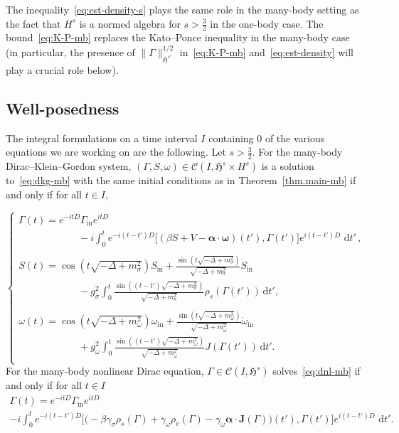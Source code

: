 \documentclass[10pt]{amsart}
\theoremstyle{definition}\newtheorem{defi}[theo]{Definition}\newtheorem{rema}[theo]{Remark}\newtheorem{exam}[theo]{Example}\newtheorem{exem}[theo]{Example}\newtheorem{nota}[theo]{Notation}
\newcommand{\rmin}{\mathrm{in}}
\newcommand{\cC}{\mathcal{C}}
\newcommand{\gH}{\mathfrak{H}}
\renewcommand\d[1]{{\ensuremath{\,\text{d}#1}}}
\newcommand{\dps}{\displaystyle}
\begin{document}
The inequality~\eqref{eq:est-density-s} plays the same role in the many-body setting as the fact that $H^s$ is a normed algebra for $s>\tfrac32$ in the one-body case. The bound~\eqref{eq:K-P-mb} replaces the Kato--Ponce inequality in the many-body case (in particular, the presence of $\|\Gamma\|_{\gH^{s'}}^{1/2}$ in~\eqref{eq:K-P-mb} and~\eqref{eq:est-density} will play a crucial role below).

\subsection{Well-posedness}

The integral formulations on a time interval $I$ containing $0$ of the various equations we are working on are the following. Let $s>\tfrac32$. For the many-body Dirac--Klein--Gordon system, $(\Gamma,S,\omega)\in\cC(I,\gH^s\times H^s)$ is a solution to~\eqref{eq:dkg-mb} with the same initial conditions as in Theorem~\ref{thm.main-mb} if and only if for all $t\in I$,


\begin{equation}
\begin{cases}\label{eq:dkg-mb-int}
\dps\Gamma(t)= e^{-itD} \Gamma_{\rmin} e^{itD}\\
\qquad\qquad\qquad- i\int_0^te^{-i(t-t')D}\big[({ \beta}S + V - {\bm \alpha}\cdot {\bm \omega})(t'),\Gamma(t')\big]e^{i(t-t')D}\,\d t'\,,
\\
\\
\dps S(t)=
\cos\left(t\sqrt{-\Delta + m^2_\sigma}\right) S_\rmin + \frac{\sin\left(t\sqrt{-\Delta + m^2_\sigma}\right)}{\sqrt{-\Delta + m^2_\sigma}}\dot{S}_\rmin
\\\dps\qquad\qquad\qquad -g_\sigma^2\int_0^t\frac{\sin\left((t-t')\sqrt{-\Delta + m^2_\sigma}\right)}{\sqrt{-\Delta + m^2_\sigma}}\rho_s(\Gamma(t'))\d t',\\
\\
\dps\omega(t)=
\cos\left(t\sqrt{-\Delta + m^2_\omega}\right)\omega_\rmin + \frac{\sin\left(t\sqrt{-\Delta + m^2_\omega}\right)}{\sqrt{-\Delta + m^2_\omega}}\dot{\omega}_\rmin
\\\dps\qquad\qquad\qquad +g_\omega^2\int_0^t\frac{\sin\left((t-t')\sqrt{-\Delta + m^2_\omega}\right)}{\sqrt{-\Delta + m^2_\omega}}J(\Gamma(t')) \d t'.\\
\end{cases}
\end{equation}
For the many-body nonlinear Dirac equation, $\Gamma\in\cC(I,\gH^s)$ solves~\eqref{eq:dnl-mb} if and only if for all $t\in I$
\begin{multline}\label{eq:dnl-mb-int}
\Gamma(t)= e^{-itD} \Gamma_{\rmin} e^{itD} \\
- i\int_0^te^{-i(t-t')D}\big[\big(- { \beta}\gamma_\sigma \rho_s(\Gamma) + \gamma_\omega \rho_v(\Gamma) - \gamma_\omega {\bm \alpha}\cdot {\bm J}(\Gamma)\big)(t'),\Gamma(t')\big]e^{i(t-t')D}\,\d t'.
\end{multline}
\end{document}
